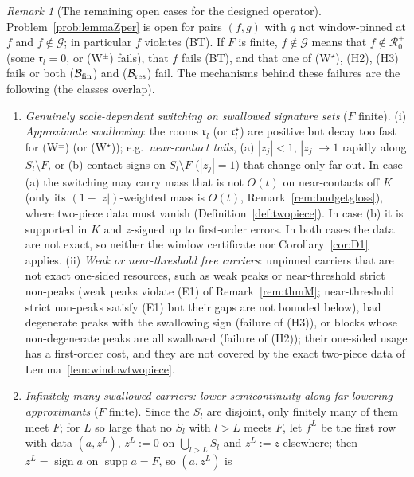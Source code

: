 \documentclass[10pt]{amsart}
\theoremstyle{definition}
\theoremstyle{remark}
\newtheorem{remark}[theorem]{Remark}
\newcommand{\supp}{\operatorname{supp}}
\newcommand{\sgn}{\operatorname{sign}}
\begin{document}
\begin{remark}[The remaining open cases for the designed operator]\label{rem:openZ}
Problem~\ref{prob:lemmaZper} is open for pairs $(f,g)$ with $g$ not
window-pinned at $f$ and $f\notin\mathcal G$; in particular $f$ violates
\textup{(BT)}.  If $F$ is finite, $f\notin\mathcal G$ means that
$f\notin\mathcal R_0^\pm$ (some $\mathfrak r_l=0$, or \textup{(W$^\pm$)}
fails), that $f$ fails \textup{(BT)}, and that one of \textup{(W$^\star$)},
\textup{(H2)}, \textup{(H3)} fails or both \textup{($\mathcal B_{\rm
fin}$)} and \textup{($\mathcal B_{\rm res}$)} fail.  The mechanisms behind
these failures are the following (the classes overlap).
\begin{enumerate}
\item[(O1)] \emph{Genuinely scale-dependent switching on swallowed
signature sets} ($F$ finite).  (i) \emph{Approximate swallowing}: the
rooms $\mathfrak r_l$ (or $\mathfrak r^\star_l$) are positive but decay too
fast for (W$^\pm$) (or (W$^\star$)); e.g.\ \emph{near-contact tails},
(a) $|z_j|<1$, $|z_j|\to1$ rapidly along $S_l\setminus F$, or (b) contact
signs on $S_l\setminus F$ ($|z_j|=1$) that change only far out.  In case
(a) the switching may carry mass that is not $O(t)$ on near-contacts off
$K$ (only its $(1-|z|)$-weighted mass is $O(t)$,
Remark~\ref{rem:budgetgloss}), where two-piece data must vanish
(Definition~\ref{def:twopiece}).  In case (b) it is supported in $K$ and
$z$-signed up to first-order errors.  In both cases the data are not
exact, so neither the window certificate nor Corollary~\ref{cor:D1}
applies.  (ii) \emph{Weak
or near-threshold free carriers}: unpinned carriers that are not exact
one-sided resources, such as weak peaks or near-threshold strict non-peaks
(weak peaks violate (E1) of Remark~\ref{rem:thmM}; near-threshold strict
non-peaks satisfy (E1) but their gaps are not bounded below), bad degenerate peaks with the
swallowing sign (failure of (H3)), or blocks whose non-degenerate peaks
are all swallowed (failure of (H2)); their one-sided usage has a
first-order cost, and they are not covered by the exact two-piece data of
Lemma~\ref{lem:windowtwopiece}.
\item[(O2)] \emph{Infinitely many swallowed carriers: lower
semicontinuity along far-lowering approximants} ($F$ finite).  Since the
$S_l$ are disjoint, only finitely many of them meet $F$; for $L$ so large
that no $S_l$ with $l>L$ meets $F$, let $f^L$
be the first row with data $(a,z^L)$, $z^L:=0$ on $\bigcup_{l>L}S_l$ and
$z^L:=z$ elsewhere; then $z^L=\sgn a$ on $\supp a=F$, so $(a,z^L)$ is

\end{enumerate}
\end{remark}
\end{document}
